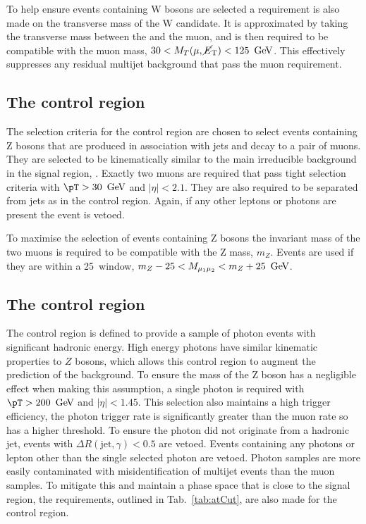 To help ensure events containing W bosons are selected a requirement
is also made on the transverse mass of the W candidate. It is
approximated by taking the transverse mass between the \MET and the
muon, and is then required to be compatible with the muon mass,
$30<M_T(\mu,\mbox{$\cancel{E}_\text{T}$})<125~\mathrm{\,Ge\kern -0.1em V}$. This effectively suppresses any residual
\QCD multijet background that pass the muon requirement.

\subsection{The \mmj control region}

The selection criteria for the \mmj control region are chosen to
select events containing Z bosons that are produced in association
with jets and decay to a pair of muons. They are selected to be
kinematically similar to the main irreducible background in the signal
region, \znunu. Exactly two muons are required that
pass tight selection criteria with $\pT>30~\gev$ and $|\eta|<2.1$.
They are also required to be separated from jets as in the \mj control
region. Again, if any other leptons or photons are present the event
is vetoed.

To maximise the selection of events containing Z bosons the
invariant mass of the two muons is required to be compatible with the
Z mass, $m_Z$. Events are used if they are within a 25~\gev window,
$m_Z-25<M_{\mu_1\mu_2}<m_Z+25~\mathrm{\,Ge\kern -0.1em V}$.

\subsection{The \gj control region}

The \gj control region is defined to provide a sample of photon events
with significant hadronic energy. High energy photons have similar
kinematic properties to $Z$ bosons, which allows this control region
to augment the prediction of the \znunu background. To
ensure the mass of the Z boson has a negligible effect when making
this assumption, a single photon is required with $\pT>200~\gev$ and
$|\eta|<1.45$. This selection also maintains a high trigger
efficiency, the photon trigger rate is significantly greater than the
muon rate so has a higher \pT threshold. To ensure the photon did not
originate from a hadronic jet, events with $\Delta
R(\mathrm{jet},\gamma)<0.5$ are vetoed. Events containing any photons
or lepton other than the single selected photon are vetoed. Photon
samples are more easily contaminated with misidentification of \QCD
multijet events than the muon samples. To mitigate this and maintain a
phase space that is close to the signal region, the \alphat
requirements, outlined in Tab.~\ref{tab:atCut}, are also made for the \gj
control region.


